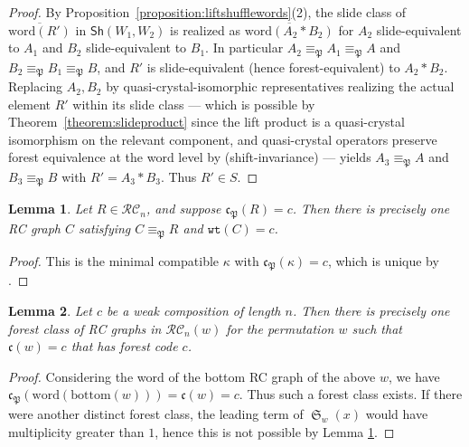 \documentclass{amsart}
\newtheorem{lemma}{Lemma}[subsection]
\theoremstyle{definition}
\theoremstyle{remark}
\numberwithin{equation}{subsection}
\DeclareMathOperator{\sch}{\mathfrak{S}}
\newcommand{\wtt}{\mathtt{wt}}
\newcommand{\RC}{\mathcal{RC}}
\newcommand{\code}{\mathfrak{c}}
\newcommand{\forest}{\mathfrak{P}}
\begin{document}
\begin{proof}
By Proposition~\ref{proposition:liftshufflewords}(2), the slide class of $\overline{\mathrm{word}(R')}$ in $\mathsf{Sh}(W_1,W_2)$ is realized as $\overline{\mathrm{word}(A_2*B_2)}$ for $A_2$ slide-equivalent to $A_1$ and $B_2$ slide-equivalent to $B_1$. In particular $A_2\equiv_\forest A_1\equiv_\forest A$ and $B_2\equiv_\forest B_1\equiv_\forest B$, and $R'$ is slide-equivalent (hence forest-equivalent) to $A_2*B_2$. Replacing $A_2,B_2$ by quasi-crystal-isomorphic representatives realizing the actual element $R'$ within its slide class --- which is possible by Theorem~\ref{theorem:slideproduct} since the lift product is a quasi-crystal isomorphism on the relevant component, and quasi-crystal operators preserve forest equivalence at the word level by \cite[Proposition~5.8]{nadeau2024forest} (shift-invariance) --- yields $A_3\equiv_\forest A$ and $B_3\equiv_\forest B$ with $R'=A_3*B_3$. Thus $R'\in S$.
\end{proof}



\begin{lemma} \label{lemma:forestlead}
Let $R\in \RC_n$, and suppose $\code_\forest(R) = c$. Then there is precisely one RC graph $C$ satisfying $C\equiv_\forest R$ and $\wtt(C) = c$.
\end{lemma}
\begin{proof}
This is the minimal compatible $\kappa$ with $\code_\forest(\kappa) = c$, which is unique by \cite[Lemma~3.12]{nadeau2024forest}.
\end{proof}

\begin{lemma} \label{lemma:forestchoice}
  Let $c$ be a weak composition of length $n$. Then there is precisely one forest class of RC graphs in $\RC_n(w)$ for the permutation $w$ such that $\code(w)=c$ that has forest code $c$.
\end{lemma}
\begin{proof}
Considering the word of the bottom RC graph of the above $w$, we have $\code_\forest(\mathrm{word}(\mathrm{bottom}(w))) = \code(w) = c$. Thus such a forest class exists. If there were another distinct forest class, the leading term of $\sch_w(x)$ would have multiplicity greater than $1$, hence this is not possible by Lemma \ref{lemma:forestlead}.
\end{proof}
\end{document}
